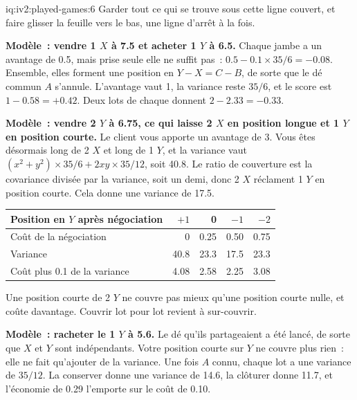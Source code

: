 \begin{solution}{iq:iv2:played-games:6}
Garder tout ce qui se trouve sous cette ligne couvert, et faire glisser la feuille vers le bas, une ligne d'arrêt à la fois.

\ivstop
\textbf{Modèle~: vendre 1 $X$ à 7.5 et acheter 1 $Y$ à 6.5.} Chaque jambe a un avantage de 0.5, mais prise seule elle ne suffit pas~: $0.5 - 0.1 \times 35/6 = -0.08$. Ensemble, elles forment une position en $Y - X = C - B$, de sorte que le dé commun $A$ s'annule. L'avantage vaut 1, la variance reste $35/6$, et le score est $1 - 0.58 = +0.42$. Deux lots de chaque donnent $2 - 2.33 = -0.33$.

\ivstop
\textbf{Modèle~: vendre 2 $Y$ à 6.75, ce qui laisse 2 $X$ en position longue et 1 $Y$ en position courte.} Le client vous apporte un avantage de 3. Vous êtes désormais long de 2 $X$ et long de 1 $Y$, et la variance vaut $(x^2 + y^2) \times 35/6 + 2xy \times 35/12$, soit 40.8. Le ratio de couverture est la covariance divisée par la variance, soit un demi, donc 2 $X$ réclament 1 $Y$ en position courte. Cela donne une variance de 17.5.
\begin{center}\small
\begin{tabular}{@{}l*{4}{r}@{}}
Position en $Y$ après négociation & $+1$ & 0 & $-1$ & $-2$ \\ \hline
Coût de la négociation & 0 & 0.25 & 0.50 & 0.75 \\
Variance & 40.8 & 23.3 & 17.5 & 23.3 \\
Coût plus 0.1 de la variance & 4.08 & 2.58 & 2.25 & 3.08
\end{tabular}
\end{center}
Une position courte de 2 $Y$ ne couvre pas mieux qu'une position courte nulle, et coûte davantage. Couvrir lot pour lot revient à sur-couvrir.

\ivstop
\textbf{Modèle~: racheter le 1 $Y$ à 5.6.} Le dé qu'ils partageaient a été lancé, de sorte que $X$ et $Y$ sont indépendants. Votre position courte sur $Y$ ne couvre plus rien~: elle ne fait qu'ajouter de la variance. Une fois $A$ connu, chaque lot a une variance de $35/12$. La conserver donne une variance de 14.6, la clôturer donne 11.7, et l'économie de 0.29 l'emporte sur le coût de 0.10.


\end{solution}

